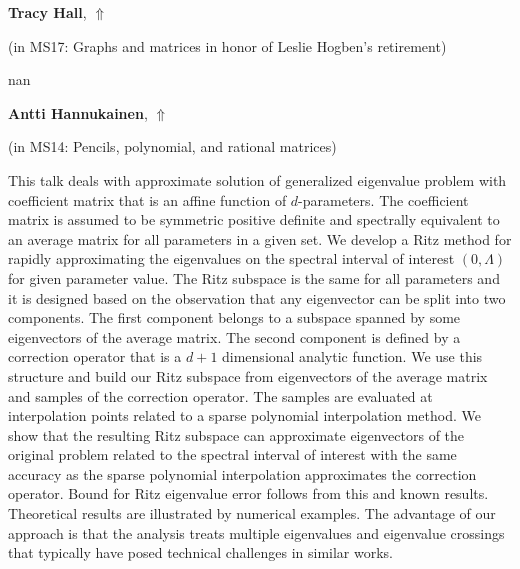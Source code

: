 \documentclass[ILAS2025-program.tex]{subfiles}
\begin{document}
\hypertarget{down0377}{}\begin{ilasabstract}
    
\textbf{Tracy Hall},  \hfill \hyperlink{up0377}{$\Uparrow$}
    
    
(in {\color{mstitle}MS17: Graphs and matrices in honor of Leslie Hogben's retirement})
        
\mtskip
    nan
\end{ilasabstract}
    

\hypertarget{down0329}{}\begin{ilasabstract}
    
\textbf{Antti Hannukainen},  \hfill \hyperlink{up0329}{$\Uparrow$}
    
    
(in {\color{mstitle}MS14: Pencils, polynomial, and rational matrices})
        
\mtskip
    This talk deals with approximate solution of generalized eigenvalue problem with coefficient matrix that is an affine function of $d$-parameters. The coefficient matrix is assumed to be symmetric positive definite and spectrally equivalent to an average matrix for all parameters in a given set. We develop a Ritz method for rapidly approximating the eigenvalues on the spectral interval of interest $(0,\Lambda)$ for given parameter value. The Ritz subspace is the same for all parameters and it is designed based on the observation that any eigenvector can be split into two components. The first component belongs to a subspace spanned by some eigenvectors of the average matrix. The second component is defined by a correction operator that is a $d+1$ dimensional analytic function. We use this structure and build our Ritz subspace from eigenvectors of the average matrix and samples of the correction operator. The samples are evaluated at interpolation points related to a sparse polynomial interpolation method. We show that the resulting Ritz subspace can approximate eigenvectors of the original problem related to the spectral interval of interest with the same accuracy as the sparse polynomial interpolation approximates the correction operator. Bound for Ritz eigenvalue error follows from this and known results. Theoretical results are illustrated by numerical examples. The advantage of our approach is that the analysis treats multiple eigenvalues and eigenvalue crossings that typically have posed technical challenges in similar works.

\end{ilasabstract}
    
\end{document}

